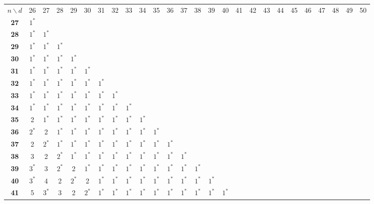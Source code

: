 
\begin{sidewaystable}
\smaller[2]
\centering
\setlength{\tabcolsep}{4.5pt}
\begin{tabular}{|c| c c c c c c c c c c c c c c c c c c c c c c c c c |}
\hline
$n \backslash  d$ & 26 & 27 & 28 & 29 & 30 & 31 & 32 & 33 & 34 & 35 & 36 & 37 & 38 & 39 & 40 & 41 & 42 & 43 & 44 & 45 & 46 & 47 & 48 & 49 & 50 \\
\Xhline{4\arrayrulewidth}
\textbf{27} & $1^*$ & & & & & & & & & & & & & & & & & & & & & & & & \\
\textbf{28} & $1^*$ & $1^*$ & & & & & & & & & & & & & & & & & & & & & & & \\
\textbf{29} & $1^*$ & $1^*$ & $1^*$ & & & & & & & & & & & & & & & & & & & & & & \\
\textbf{30} & $1^*$ & $1^*$ & $1^*$ & $1^*$ & & & & & & & & & & & & & & & & & & & & & \\
\textbf{31} & $1^*$ & $1^*$ & $1^*$ & $1^*$ & $1^*$ & & & & & & & & & & & & & & & & & & & & \\
\textbf{32} & $1^*$ & $1^*$ & $1^*$ & $1^*$ & $1^*$ & $1^*$ & & & & & & & & & & & & & & & & & & & \\
\textbf{33} & $1^*$ & $1^*$ & $1^*$ & $1^*$ & $1^*$ & $1^*$ & $1^*$ & & & & & & & & & & & & & & & & & & \\
\textbf{34} & $1^*$ & $1^*$ & $1^*$ & $1^*$ & $1^*$ & $1^*$ & $1^*$ & $1^*$ & & & & & & & & & & & & & & & & & \\
\textbf{35} & 2 & $1^*$ & $1^*$ & $1^*$ & $1^*$ & $1^*$ & $1^*$ & $1^*$ & $1^*$ & & & & & & & & & & & & & & & & \\
\textbf{36} & $2^*$ & 2 & $1^*$ & $1^*$ & $1^*$ & $1^*$ & $1^*$ & $1^*$ & $1^*$ & $1^*$ & & & & & & & & & & & & & & & \\
\textbf{37} & 2 & $2^*$ & $1^*$ & $1^*$ & $1^*$ & $1^*$ & $1^*$ & $1^*$ & $1^*$ & $1^*$ & $1^*$ & & & & & & & & & & & & & & \\
\textbf{38} & 3 & 2 & $2^*$ & $1^*$ & $1^*$ & $1^*$ & $1^*$ & $1^*$ & $1^*$ & $1^*$ & $1^*$ & $1^*$ & & & & & & & & & & & & & \\
\textbf{39} & $3^*$ & 3 & $2^*$ & 2 & $1^*$ & $1^*$ & $1^*$ & $1^*$ & $1^*$ & $1^*$ & $1^*$ & $1^*$ & $1^*$ & & & & & & & & & & & & \\
\textbf{40} & $3^*$ & 4 & 2 & $2^*$ & 2 & $1^*$ & $1^*$ & $1^*$ & $1^*$ & $1^*$ & $1^*$ & $1^*$ & $1^*$ & $1^*$ & & & & & & & & & & & \\
\textbf{41} & 5 & $3^*$ & 3 & 2 & $2^*$ & $1^*$ & $1^*$ & $1^*$ & $1^*$ & $1^*$ & $1^*$ & $1^*$ & $1^*$ & $1^*$ & $1^*$ & & & & & & & & & & \\

\end{tabular}
\end{sidewaystable}
